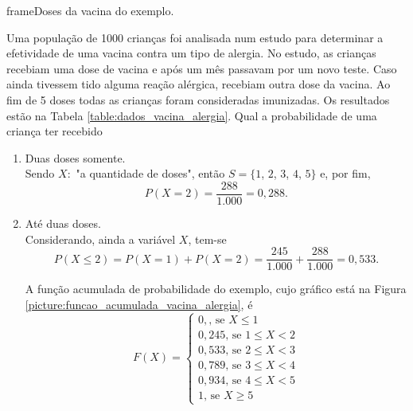 \documentclass[11pt,fleqn]{book}
\numberwithin{mpicture}{chapter}
\numberwithin{mtable}{chapter}
\numberwithin{mframe}{chapter}
\begin{document}
\begin{pageWidthArea}
	\begin{pageWidthAreaPicture}{frame}{Doses da vacina do exemplo.}
		\label{table:dados_vacina_alergia}
		\hspace{-15pt}
	\end{pageWidthAreaPicture}

	\vspace{10pt}

	\begin{example}
		Uma população de 1000 crianças foi analisada num estudo para determinar a efetividade de uma vacina contra um tipo de alergia. No estudo, as crianças recebiam uma dose de vacina e após um mês passavam por um novo teste. Caso ainda tivessem tido alguma reação alérgica, recebiam outra dose da vacina. Ao fim de 5 doses todas as crianças foram consideradas imunizadas. Os resultados estão na Tabela \ref{table:dados_vacina_alergia}. Qual a probabilidade de uma criança ter recebido
		\begin{enumerate}[label=\alph*]
			\item Duas doses somente.\hfill\\
			
				Sendo $X:$ "a quantidade de doses", então $S=\{1$, $2$, $3$, $4$, $5\}$ e, por fim,
				\[
					P(X=2)=\frac{288}{1.000}=0,288\text{.}
				\]

			\item Até duas doses.\hfill\\
			
				Considerando, ainda a variável $X$, tem-se
				\[
					P(X\leqslant 2)=P(X=1)+P(X=2)=\frac{245}{1.000} + \frac{288}{1.000}=0,533\text{.}
				\]

			A função acumulada de probabilidade do exemplo, cujo gráfico está na Figura \ref{picture:funcao_acumulada_vacina_alergia}, é
			\[
				F(X)= \begin{cases}
					0, \text{, se } X\leqslant 1\\
					0,245 \text{, se } 1\leqslant X < 2\\
					0,533 \text{, se } 2\leqslant X < 3\\
					0,789 \text{, se } 3 \leqslant X < 4\\
					0,934 \text{, se } 4 \leqslant X < 5\\
					1 \text{, se } X \geqslant 5
				\end{cases}
			\]
		\end{enumerate}
	\end{example}
	

\end{pageWidthArea}
\end{document}
